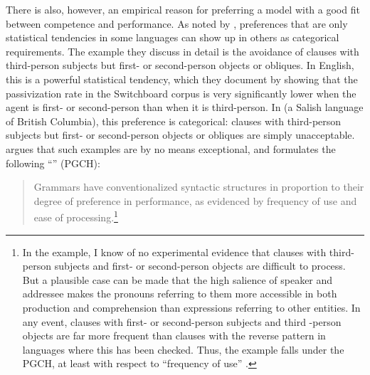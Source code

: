 \documentclass[a4paper]{article}
\begin{document}
There is also, however, an empirical reason for preferring a model with a good fit between competence and performance.  As noted by \citet{BresnanEtAl2001}, preferences that are only statistical tendencies in some languages can show up in others as categorical requirements.  The example they discuss in detail is the avoidance of clauses with third-person subjects but first- or second-person objects or obliques. In English, this is a powerful statistical tendency, which they document by showing that the passivization rate in the Switchboard corpus is very significantly lower when the agent is first- or second-person than when it is third-person.  In  (a Salish language of British Columbia), this preference is categorical:  clauses with third-person subjects but first- or second-person objects or obliques are simply unacceptable.  \citet{Hawkins2004a-u,Hawkins2014} argues that such examples are by no means exceptional, and formulates the following ``'' (PGCH):
\begin{quote}
Grammars  have  conventionalized  syntactic  structures  in  proportion   to their degree of preference in performance, as evidenced by frequency of use and ease of processing.\footnote {In the \citeauthor{BresnanEtAl2001} example, I know of no experimental evidence that clauses with third-person subjects and first- or second-person objects are difficult to process.  But a plausible case can be made that the high salience of speaker and addressee makes the pronouns referring to them more accessible in both production and comprehension than expressions referring to other entities.  In any event, clauses with first- or second-person subjects and third -person objects are far more frequent than clauses with the reverse pattern in languages where this has been checked.  Thus, the \citeauthor{BresnanEtAl2001} example falls under the PGCH, at least with respect to ``frequency of use'' .}
\end{quote}
\end{document}
